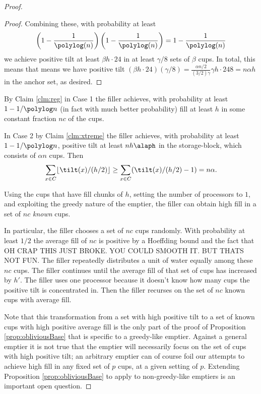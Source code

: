 \begin{proof}
\begin{proof}
  Combining these, with probability at least
  $$\left(1-\frac{1}{\polylog(n)}\right)\left(1-\frac{1}{\polylog(n)}\right) =
  1-\frac{1}{\polylog(n)}$$ we achieve positive
  tilt at least $\beta h\cdot 24$ in at least $\gamma/8$ sets of $\beta$ cups. In
  total, this means that means we have positive tilt $(\beta h \cdot 24)(\gamma/8) =
  \frac{\alpha n/2}{(3/2)\gamma}\gamma h \cdot{24}{8} = n\alpha h$ in the anchor set, as desired.

\end{proof}

  By Claim \ref{clm:reg} in Case 1 the filler achieves, with probability at least
  $1-1/\polylog n$ (in fact with much better probability) fill at least $h$ in
  some constant fraction $nc$ of the cups.

  In Case 2 by Claim \ref{clm:xtreme} the filler achieves, with probability at least
  $1-1/\polylog n$, positive tilt at least $nh\alaph$ in the storage-block,
  which consists of $\alpha n$ cups. Then 
  $$\sum_{x\in C} \lfloor \tilt(x) / (h/2) \rfloor \ge \sum_{x\in C} (\tilt(x) / (h/2) -1) = n\alpha.$$

  Using the cups that have fill chunks of $h$, setting the number of processors to $1$, and
  exploiting the greedy nature of the emptier, the filler can obtain high fill
  in a set of $nc$ \emph{known} cups.

  In particular, the filler chooses a set of $nc$ cups randomly.
  With probability at least $1/2$ the average fill of $nc$ is positive by a
  Hoeffding bound and the fact that 
  OH CRAP THIS JUST BROKE. YOU COULD SMOOTH IT. BUT THATS NOT FUN.
  The filler repeatedly distributes a unit of water equally among these $nc$ cups. 
  The filler continues until the average fill of that set of cups has increased
  by $h'$. The filler uses one processor because it doesn't know how many cups
  the positive tilt is concentrated in. Then the filler recurses on the set of
  $nc$ known cups with average fill.

  Note that this transformation from a set with high positive tilt to a set of
  known cups with high positive average fill is the only part of the proof of
  Proposition \ref{prop:obliviousBase} that is specific to a greedy-like
  emptier. Against a general emptier it is not true that the emptier will
  necessarily focus on the set of cups with high positive tilt; an arbitrary
  emptier can of course foil our attempts to achieve high fill in any fixed set
  of $p$ cups, at a given setting of $p$. Extending Proposition
  \ref{prop:obliviousBase} to apply to non-greedy-like emptiers is an important
  open question.
\end{proof}




